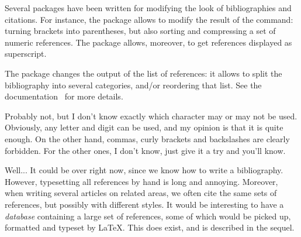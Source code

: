 
Several packages have been written for modifying the look 
of bibliographies and citations. For instance, 
the package  allows to modify the result of the 
 command: turning brackets into parentheses, but also
sorting and compressing a set of numeric references. 
The package  allows, moreover, to get references 
displayed as superscript.

The package  changes the output of the list of 
references: it allows to split the bibliography into several 
categories, and\slash or reordering that list. See the 
documentation~\cite{splitbib} for more details.


Probably not, but I don't know exactly which character may or may not
be used. Obviously, any letter and digit can be used, and my opinion
is that it is quite enough. On the other hand, commas, curly brackets
and backslashes are clearly forbidden. For the other ones, I don't
know, just give it a try and you'll know. 



Well... It could be over right now, since we know how to write a
bibliography. However, typesetting all references by hand is long and
annoying. Moreover, when writing several articles on related areas, 
we often cite the same sets of references, but possibly with different styles. 
It would be interesting to have a \emph{database} containing a large
set of references, some of which would be picked up, formatted and typeset by
\LaTeX. This does exist, and is described in the sequel.
